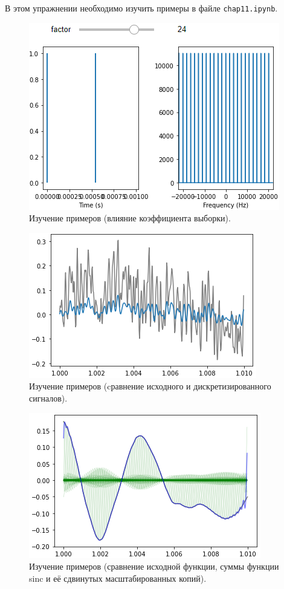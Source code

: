 \documentclass[a4paper, 14pt]{extarticle}
\begin{document}
    В этом упражнении необходимо изучить примеры в файле \texttt{chap11.ipynb}.

    \begin{figure}[H]
        \centering
        \includegraphics[width=0.7\linewidth]{resources/Images/task1_examples_1}
        \caption{Изучение примеров (влияние коэффициента выборки).}
        \label{fig:task1_examples_1}
    \end{figure}

    \begin{figure}[H]
        \centering
        \includegraphics[width=0.7\linewidth]{resources/Images/task1_examples_2}
        \caption{Изучение примеров (cравнение исходного и дискретизированного сигналов).}
        \label{fig:task1_examples_2}
    \end{figure}

    \begin{figure}[H]
        \centering
        \includegraphics[width=0.7\linewidth]{resources/Images/task1_examples_3}
        \caption{Изучение примеров (сравнение исходной функции, суммы функции sinc и её сдвинутых масштабированных копий).}
        \label{fig:task1_examples_3}
    \end{figure}
\end{document}
